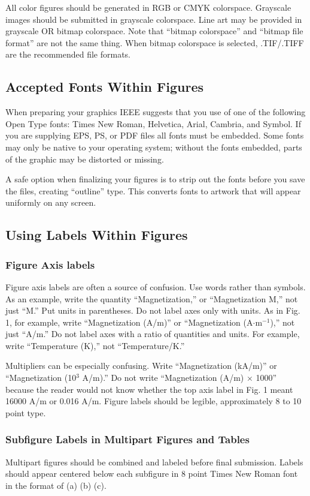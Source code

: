 \documentclass[journal,twoside,web]{ieeecolor}
\begin{document}
All color figures should be generated in RGB or CMYK colorspace. Grayscale
images should be submitted in grayscale colorspace. Line art may be
provided in grayscale OR bitmap colorspace. Note that ``bitmap colorspace''
and ``bitmap file format'' are not the same thing. When bitmap colorspace
is selected, .TIF/.TIFF are the recommended file formats.

\subsection{Accepted Fonts Within Figures}
When preparing your graphics IEEE suggests that you use of one of the
following Open Type fonts: Times New Roman, Helvetica, Arial, Cambria, and
Symbol. If you are supplying EPS, PS, or PDF files all fonts must be
embedded. Some fonts may only be native to your operating system; without
the fonts embedded, parts of the graphic may be distorted or missing.

A safe option when finalizing your figures is to strip out the fonts before
you save the files, creating ``outline'' type. This converts fonts to
artwork that will appear uniformly on any screen.

\subsection{Using Labels Within Figures}

\subsubsection{Figure Axis labels}
Figure axis labels are often a source of confusion. Use words rather than
symbols. As an example, write the quantity ``Magnetization,'' or
``Magnetization M,'' not just ``M.'' Put units in parentheses. Do not label
axes only with units. As in Fig. 1, for example, write ``Magnetization
(A/m)'' or ``Magnetization (A$\cdot$m$^{-1}$),'' not just ``A/m.''
Do not label axes with a ratio of quantities and units.
For example, write ``Temperature (K),'' not ``Temperature/K.''

Multipliers can be especially confusing. Write ``Magnetization (kA/m)'' or
``Magnetization (10$^{3}$ A/m).'' Do not write ``Magnetization
(A/m)$\,\times\,$1000'' because the reader would not know whether the top
axis label in Fig. 1 meant 16000 A/m or 0.016 A/m. Figure labels should be
legible, approximately 8 to 10 point type.

\subsubsection{Subfigure Labels in Multipart Figures and Tables}
Multipart figures should be combined and labeled before final submission.
Labels should appear centered below each subfigure in 8 point Times New
Roman font in the format of (a) (b) (c).
\end{document}
